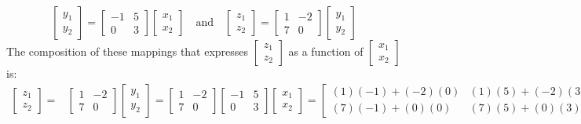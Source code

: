 \documentclass{article}
\begin{document}
\begin{itemize}
\[\begin{bmatrix} y_1 \\ y_2 \end{bmatrix} = \begin{bmatrix} -1 & 5 \\ 0 & 3 \end{bmatrix}\begin{bmatrix} x_1 \\ x_2 \end{bmatrix} \quad\text{and}\quad \begin{bmatrix} z_1 \\ z_2 \end{bmatrix} = \begin{bmatrix} 1 & -2 \\ 7 & 0 \end{bmatrix}\begin{bmatrix} y_1 \\ y_2 \end{bmatrix}\]  
The composition of these mappings that expresses \(\begin{bmatrix} z_1 \\ z_2 \end{bmatrix}\) as a function of \(\begin{bmatrix} x_1 \\ x_2 \end{bmatrix}\) is:
\begin{align*}
\begin{bmatrix} 
z_1 \\ z_2 
\end{bmatrix} 
= & \begin{bmatrix} 1 & -2 \\ 7 & 0 \end{bmatrix}\begin{bmatrix} y_1 \\ y_2 \end{bmatrix}
= \begin{bmatrix} 1 & -2 \\ 7 & 0 \end{bmatrix}\begin{bmatrix} -1 & 5 \\ 0 & 3 \end{bmatrix}\begin{bmatrix} x_1 \\ x_2 \end{bmatrix}  
= \begin{bmatrix} (1)(-1) + (-2)(0) & (1)(5) + (-2)(3) \\ (7)(-1) + (0)(0) & (7)(5) + (0)(3) \end{bmatrix}\begin{bmatrix} x_1 \\ x_2 \end{bmatrix} \\

\end{align*}
\end{itemize}
\end{document}
